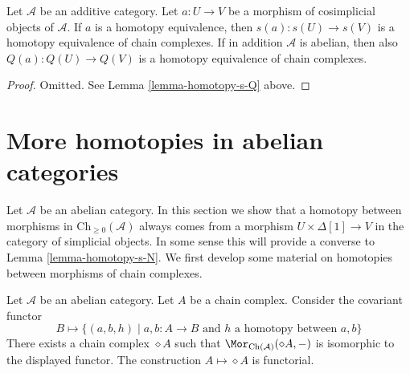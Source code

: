 \begin{lemma}
\label{lemma-homotopy-equivalence-s-Q}
Let $\mathcal{A}$ be an additive category. Let $a : U \to V$ be a morphism
of cosimplicial objects of $\mathcal{A}$. If $a$ is a homotopy equivalence,
then $s(a) : s(U) \to s(V)$ is a homotopy equivalence of chain complexes.
If in addition $\mathcal{A}$ is abelian, then also
$Q(a) : Q(U) \to Q(V)$ is a homotopy equivalence of chain complexes.
\end{lemma}

\begin{proof}
Omitted. See Lemma \ref{lemma-homotopy-s-Q} above.
\end{proof}




\section{More homotopies in abelian categories}
\label{section-backwards-homotopy}

\noindent
Let $\mathcal{A}$ be an abelian category.
In this section we show that a homotopy between
morphisms in $\text{Ch}_{\geq 0}(\mathcal{A})$
always comes from a morphism $U \times \Delta[1] \to V$
in the category of simplicial objects. In some sense
this will provide a converse to Lemma \ref{lemma-homotopy-s-N}.
We first develop some material on homotopies between morphisms
of chain complexes.

\begin{lemma}
\label{lemma-represent-homotopy}
Let $\mathcal{A}$ be an abelian category. Let $A$ be a chain complex.
Consider the covariant functor
$$
B \longmapsto
\{
(a, b, h)
\mid
a, b : A \to B\text{ and }h\text{ a homotopy between }a, b
\}
$$
There exists a chain complex $\diamond A$
such that $\Mor_{\text{Ch}(\mathcal{A})}(\diamond A, -)$
is isomorphic to the displayed functor.
The construction $A \mapsto \diamond A$ is functorial.
\end{lemma}

